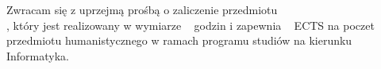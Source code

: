 \documentclass{wmiisubmission}
\begin{document}
\cracowdate
{}
\studentaddress
\addressee{\bakalarski}

\vskip 2.0cm

Zwracam się z uprzejmą prośbą o zaliczenie przedmiotu\\
\fillField{16cm}, który jest realizowany w wymiarze \fillField{3cm}~ godzin
i zapewnia \fillField{1cm}~ ECTS na poczet
przedmiotu humanistycznego w ramach programu studiów na kierunku Informatyka.

\vskip 2cm
\studentsignature

\vfill


\vskip 1.5cm

\end{document}
